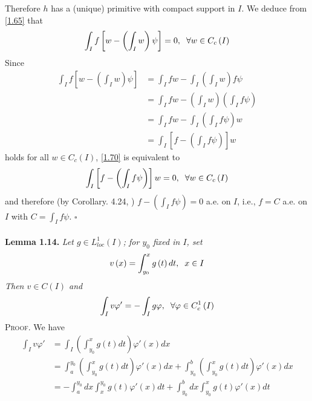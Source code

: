 \documentclass[a4paper,oneside]{article}
\numberwithin{equation}{section}
\begin{document}
Therefore $h$ has a (unique) primitive with compact support in $I$. We deduce from \eqref{1.65} that
\begin{align}
\label{1.70}
\int_I {f\left[ {w - \left( {\int_I w } \right)\psi } \right]}  = 0,\hspace{0.2cm}\forall w \in {C_c}\left( I \right)
\end{align}
Since
\begin{align}
\int_I {f\left[ {w - \left( {\int_I w } \right)\psi } \right]}  &= \int_I {fw}  - \int_I {\left( {\int_I w } \right)f\psi } \\
 &= \int_I {fw}  - \left( {\int_I w } \right)\left( {\int_I {f\psi } } \right)\\
 &= \int_I {fw}  - \int_I {\left( {\int_I {f\psi } } \right)w} \\
 &= \int_I {\left[ {f - \left( {\int_I {f\psi } } \right)} \right]w} 
\end{align}
holds for all $w\in C_c\left(I\right)$, \eqref{1.70} is equivalent to
\begin{align}
\int_I {\left[ {f - \left( {\int_I {f\psi } } \right)} \right]w}  = 0,\hspace{0.2cm}\forall w \in {C_c}\left( I \right)
\end{align}
and therefore (by Corollary. 4.24, \cite{1}) ${f - \left( {\int_I {f\psi } } \right)}=0$ a.e. on $I$, i.e., $f=C$ a.e. on $I$ with $C = \int_I {f\psi } $. \hfill $\square$\\
\\
\textbf{Lemma 1.14.} \textit{Let $g \in L_{loc}^1\left( I \right)$; for $y_0$ fixed in $I$, set}
\begin{align}
v\left( x \right) = \int_{{y_0}}^x {g\left( t \right)dt} ,\hspace{0.2cm}x \in I
\end{align}
\textit{Then $v\in C\left(I\right)$ and}
\begin{align}
\label{1.77}
\int_I {v\varphi '}  =  - \int_I {g\varphi } ,\hspace{0.2cm}\forall \varphi  \in C_c^1\left( I \right)
\end{align}
\textsc{Proof.} We have
\begin{align}
\int_I {v\varphi '}  &= \int_I {\left( {\int_{{y_0}}^x {g\left( t \right)dt} } \right)\varphi '\left( x \right)dx} \\
& = \int_a^{{y_0}} {\left( {\int_{{y_0}}^x {g\left( t \right)dt} } \right)\varphi '\left( x \right)dx}  + \int_{{y_0}}^b {\left( {\int_{{y_0}}^x {g\left( t \right)dt} } \right)\varphi '\left( x \right)dx} \\
& =  - \int_a^{{y_0}} {dx\int_x^{{y_0}} {g\left( t \right)\varphi '\left( x \right)dt} }  + \int_{{y_0}}^b {dx\int_{{y_0}}^x {g\left( t \right)\varphi '\left( x \right)dt} } 
\end{align}
\end{document}
